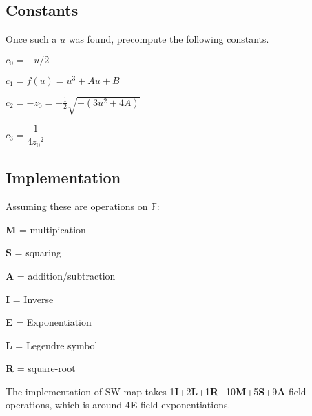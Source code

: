 \documentclass[letterpaper,11pt]{article}
\begin{document}
\subsection{Constants}
Once such a $u$ was found, precompute the following constants.
\begin{itemize}
\begin{multicols}{2}
 \item $c_0 = -u/2$
 \item $c_1 = f(u) = u^3+Au+B$
 \item $c_2 = -z_0 = -\frac{1}{2}\sqrt{-\left(3u^2+4A\right)}$
 \item $c_3 = \dfrac{1}{4{z_0}^2} $ 
\end{multicols}
\end{itemize}

\subsection{Implementation}
Assuming these are operations on $\mathbb{F}$:
\begin{itemize}
\begin{multicols}{3}
 \item \textbf{M} = multipication
 \item \textbf{S} = squaring
 \item \textbf{A} = addition/subtraction
 \item \textbf{I} = Inverse
 \item \textbf{E} = Exponentiation
 \item \textbf{L} = Legendre symbol
 \item \textbf{R} = square-root 
\end{multicols}
\end{itemize}
The implementation of SW map takes 1\textbf{I}+2\textbf{L}+1\textbf{R}+10\textbf{M}+5\textbf{S}+9\textbf{A} field operations, which is around 4\textbf{E} field exponentiations.
\end{document}
